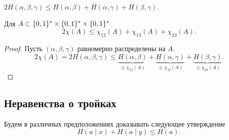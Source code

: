 \documentclass[12pt]{article}
\begin{document}
\begin{statement}
    \(2H(\alpha,\beta,\gamma)\le H(\alpha,\beta) + H(\alpha,\gamma) + H(\beta,\gamma)\).
\end{statement}
\begin{corollary}
Для \(A\subset\{0,1\}^*\times\{0,1\}^*\times\{0,1\}^*\)
\[2\chi(A) \le \chi_{12}(A) + \chi_{13}(A) + \chi_{23}(A).\]
\end{corollary}
\begin{proof}
    Пусть $(\alpha,\beta,\gamma)$ равномерно распределены на $A$.
    \[
        2\chi(A) = 2H(\alpha,\beta,\gamma)\le 
        \underbrace{H(\alpha,\beta) }_{\le\chi_{12}(A)} + 
        \underbrace{H(\alpha,\gamma)}_{\le\chi_{13}(A)} + 
        \underbrace{H(\beta,\gamma) }_{\le\chi_{23}(A)}.
    \]
\end{proof}

\subsection{Неравенства о тройках}
Будем в различных предположениях доказывать следующее утверждение
\[
    H(a\mid x) + H(a\mid y) \le H(a).
\]
\end{document}
